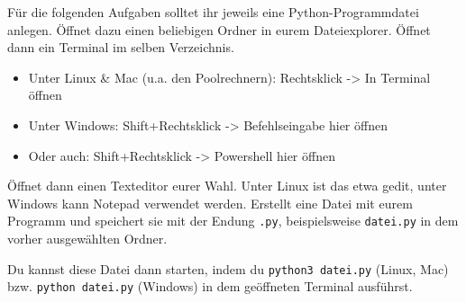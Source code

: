 Für die folgenden Aufgaben solltet ihr jeweils eine Python-Programmdatei
anlegen. Öffnet dazu einen beliebigen Ordner in eurem Dateiexplorer. Öffnet
dann ein Terminal im selben Verzeichnis.

\begin{itemize}
    \item Unter Linux \& Mac (u.a. den Poolrechnern): Rechtsklick -> In Terminal öffnen
    \item Unter Windows: Shift+Rechtsklick -> Befehlseingabe hier öffnen
    \item Oder auch: Shift+Rechtsklick -> Powershell hier öffnen
\end{itemize}

Öffnet dann einen Texteditor eurer Wahl. Unter Linux ist das etwa gedit, unter
Windows kann Notepad verwendet werden. Erstellt eine Datei mit eurem Programm
und speichert sie mit der Endung \texttt{.py}, beispielsweise \texttt{datei.py}
in dem vorher ausgewählten Ordner.

Du kannst diese Datei dann starten, indem du \texttt{python3 datei.py} (Linux, Mac)
bzw. \texttt{python datei.py} (Windows) in dem geöffneten Terminal ausführst.
